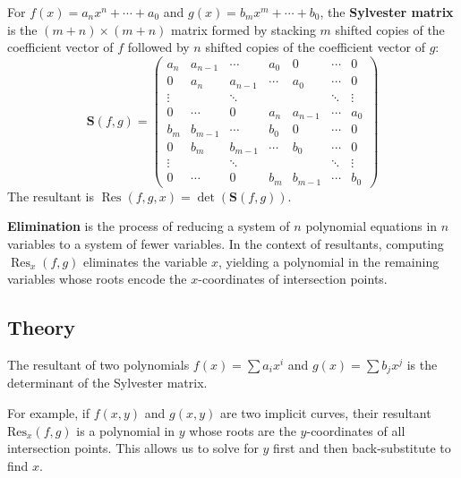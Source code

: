 \begin{definition}\label{def:sylvester_matrix}
For $f(x) = a_n x^n + \cdots + a_0$ and $g(x) = b_m x^m + \cdots + b_0$, the \textbf{Sylvester matrix} is the $(m+n) \times (m+n)$ matrix formed by stacking $m$ shifted copies of the coefficient vector of $f$ followed by $n$ shifted copies of the coefficient vector of $g$:
\[
\mathbf{S}(f,g) = \begin{pmatrix}
a_n & a_{n-1} & \cdots & a_0 & 0 & \cdots & 0 \\
0 & a_n & a_{n-1} & \cdots & a_0 & \cdots & 0 \\
\vdots & & \ddots & & & \ddots & \vdots \\
0 & \cdots & 0 & a_n & a_{n-1} & \cdots & a_0 \\
b_m & b_{m-1} & \cdots & b_0 & 0 & \cdots & 0 \\
0 & b_m & b_{m-1} & \cdots & b_0 & \cdots & 0 \\
\vdots & & \ddots & & & \ddots & \vdots \\
0 & \cdots & 0 & b_m & b_{m-1} & \cdots & b_0
\end{pmatrix}
\]
The resultant is $\operatorname{Res}(f,g,x) = \det(\mathbf{S}(f,g))$.
\end{definition}

\begin{definition}[Elimination]\label{def:elimination}
\textbf{Elimination} is the process of reducing a system of $n$ polynomial equations in $n$ variables to a system of fewer variables. In the context of resultants, computing $\operatorname{Res}_x(f, g)$ eliminates the variable $x$, yielding a polynomial in the remaining variables whose roots encode the $x$-coordinates of intersection points.
\end{definition}

\subsection{Theory}

The resultant of two polynomials $f(x) = \sum a_i x^i$ and $g(x) = \sum b_j x^j$ is the determinant of the Sylvester matrix.

For example, if $f(x, y)$ and $g(x, y)$ are two implicit curves, their resultant $\text{Res}_x(f, g)$ is a polynomial in $y$ whose roots are the $y$-coordinates of all intersection points. This allows us to solve for $y$ first and then back-substitute to find $x$.

